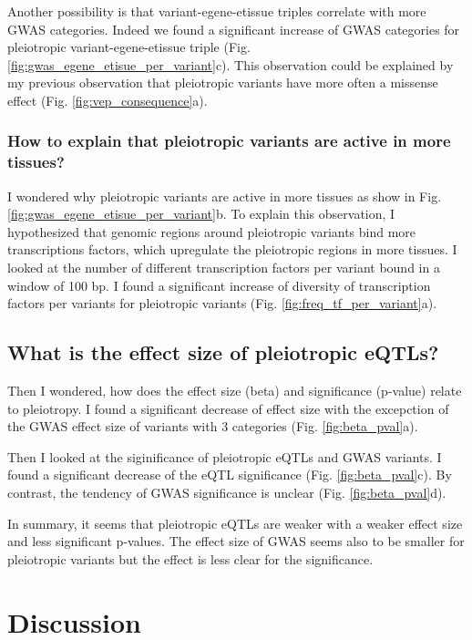 Another possibility is that variant-egene-etissue triples correlate with more GWAS categories.
%
Indeed we found a significant increase of GWAS categories for pleiotropic variant-egene-etissue triple (Fig. \ref{fig:gwas_egene_etisue_per_variant}c).
%
This observation could be explained by my previous observation that pleiotropic variants have more often a missense effect (Fig. \ref{fig:vep_consequence}a).

\subsubsection*{How to explain that pleiotropic variants are active in more tissues?}

I wondered why pleiotropic variants are active in more tissues as show in Fig. \ref{fig:gwas_egene_etisue_per_variant}b.
%
To explain this observation, I hypothesized that genomic regions around pleiotropic variants bind more transcriptions factors, which upregulate the pleiotropic regions in more tissues.
%
I looked at the number of different transcription factors per variant bound in a window of 100 bp.
%
I found a significant increase of diversity of transcription factors per variants for pleiotropic variants (Fig. \ref{fig:freq_tf_per_variant}a).


\subsection*{What is the effect size of pleiotropic eQTLs?}

Then I wondered, how does the effect size (beta) and significance (p-value) relate to pleiotropy.
%
I found a significant decrease of effect size with the excepction of the GWAS effect size of variants with 3 categories (Fig. \ref{fig:beta_pval}a).

Then I looked at the siginificance of pleiotropic eQTLs and GWAS variants.
%
I found a significant decrease of the eQTL significance (Fig. \ref{fig:beta_pval}c).
%
By contrast, the tendency of GWAS significance is unclear (Fig. \ref{fig:beta_pval}d).

In summary, it seems that pleiotropic eQTLs are weaker with a weaker effect size and less significant p-values.
%
The effect size of GWAS seems also to be smaller for pleiotropic variants but the effect is less clear for the significance.

\section*{Discussion}

